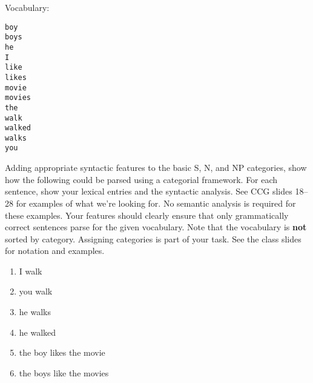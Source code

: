 \documentclass[11pt,letterpaper]{article}
\begin{document}
\noindent{}Vocabulary:
\begin{verbatim}
boy
boys
he
I
like
likes
movie
movies
the
walk
walked
walks
you
\end{verbatim}

\noindent{}Adding appropriate syntactic features to the basic S, N, and NP categories, show how the following could be parsed using a categorial framework.  For each sentence, show your lexical entries and the syntactic analysis.  See CCG slides 18--28 for examples of what we're looking for.  No semantic analysis is required for these examples.  Your features should clearly ensure that only grammatically correct sentences parse for the given vocabulary.  Note that the vocabulary is \textbf{not} sorted by category.  Assigning categories is part of your task.  See the class slides for notation and examples.

\begin{enumerate}
\item I walk
\item you walk
\item he walks
\item he walked
\item the boy likes the movie
\item the boys like the movies
\end{enumerate}
\end{document}
